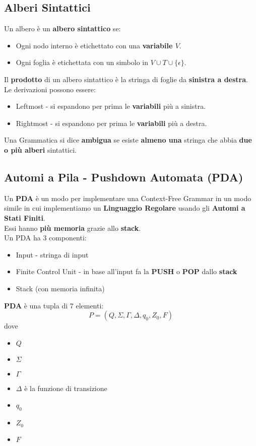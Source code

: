 \documentclass[12pt]{extarticle}
\begin{document}
\subsection{Alberi Sintattici}
Un albero è un \textbf{albero sintattico} se:
\begin{itemize}
    \item Ogni nodo interno è etichettato con una \textbf{variabile $V$}.
    \item Ogni foglia è etichettata con un simbolo in $V \cup T \cup \{\epsilon\}$.
\end{itemize}
Il \textbf{prodotto} di un albero sintattico è la stringa di foglie da \textbf{sinistra a destra}.\\
Le derivazioni possono essere:
\begin{itemize}
    \item Leftmost - si espandono per prima le \textbf{variabili} più a sinistra.
    \item Rightmost - si espandono per prima le \textbf{variabili} più a destra.
\end{itemize}
Una Grammatica si dice \textbf{ambigua} se esiste \textbf{almeno una} stringa che abbia \textbf{due o più alberi} sintattici.

\subsection{Automi a Pila - Pushdown Automata (PDA)}
Un \textbf{PDA} è un modo per implementare una Context-Free Grammar in un modo simile in cui implementiamo un \textbf{Linguaggio Regolare} usando gli \textbf{Automi a Stati Finiti}.\\
Essi hanno \textbf{più memoria} grazie allo \textbf{stack}.\\
Un PDA ha 3 componenti:
\begin{itemize}
    \item Input - stringa di input
    \item Finite Control Unit - in base all'input fa la \textbf{PUSH} o \textbf{POP} dallo \textbf{stack}
    \item Stack (con memoria infinita)
\end{itemize}
\textbf{PDA} è una tupla di 7 elementi:
\begin{equation*}
    P=(Q,\Sigma,\Gamma,\Delta,q_0,Z_0,F)
\end{equation*}
dove
\begin{itemize}
    \item $Q$
    \item $\Sigma$
    \item $\Gamma$
    \item $\Delta$ è la funzione di transizione
    \item $q_0$
    \item $Z_0$
    \item $F$
\end{itemize}
\end{document}
